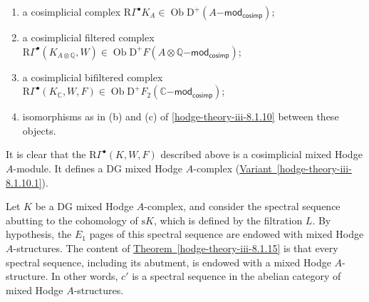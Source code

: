     
 \begin{enumerate}
      
 \item[(a)]
        a cosimplicial complex \(\mathrm {R}\Gamma ^\bullet  K_A\in \operatorname {Ob}\mathrm {D}^+(A\mathsf {-mod}_\mathsf {cosimp})\);
      


      
 \item[(b)]
        a cosimplicial filtered complex \(\mathrm {R}\Gamma ^\bullet (K_{A\otimes \mathbb {Q}},W)\in \operatorname {Ob}\mathrm {D}^+F(A\otimes \mathbb {Q}\mathsf {-mod}_\mathsf {cosimp})\);
      


      
 \item[(c)]
        a cosimplicial bifiltered complex \(\mathrm {R}\Gamma ^\bullet (K_\mathbb {C},W,F)\in \operatorname {Ob}\mathrm {D}^+F_2(\mathbb {C}\mathsf {-mod}_\mathsf {cosimp})\);
      


      
 \item[(d)]
        isomorphisms as in (b) and (c) of \cref{hodge-theory-iii-8.1.10} between these objects.
      

    \end{enumerate}\par{}It is clear that the \(\mathrm {R}\Gamma ^\bullet (K,W,F)\) described above is a cosimplicial mixed Hodge \(A\)-module.
    It defines a DG mixed Hodge \(A\)-complex (\hyperref[hodge-theory-iii-8.1.10.1]{Variant~\ref*{hodge-theory-iii-8.1.10.1}}).\label{hodge-theory-iii-8.1.14}\par{}Let \(K\) be a DG mixed Hodge \(A\)-complex, and consider the spectral sequence abutting to the cohomology of \(\mathrm {s} K\), which is defined by the filtration \(L\).
    By hypothesis, the \(E_1\) pages of this spectral sequence are endowed with mixed Hodge \(A\)-structures.
    The content of \hyperref[hodge-theory-iii-8.1.15]{Theorem~\ref*{hodge-theory-iii-8.1.15}} is that every spectral sequence, including its abutment, is endowed with a mixed Hodge \(A\)-structure.
    In other words, \(c'\) is a spectral sequence in the abelian category of mixed Hodge \(A\)-structures.
